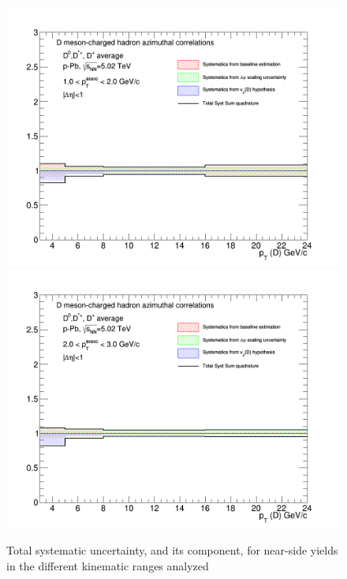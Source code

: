 \begin{figure}[!htbp]
{\includegraphics[width=0.49\linewidth, height=0.33\linewidth]{figures/FitOutput/TotalSystematicSourcesNSYield_pthad1dotto2dot.png}}
{\includegraphics[width=0.49\linewidth, height=0.33\linewidth]{figures/FitOutput/TotalSystematicSourcesNSYield_pthad2dotto3dot.png}}
\caption{Total systematic uncertainty, and its component, for near-side yields in the different kinematic ranges analyzed}
\label{fig:NSyieldTotalUnc}
\end{figure}


